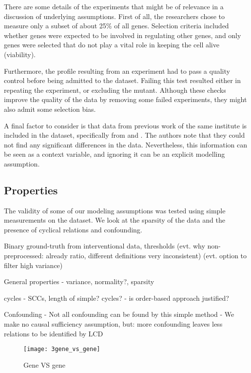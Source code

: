 There are some details of the experiments that might be of relevance in a discussion of underlying assumptions. First of all, the researchers chose to measure only a subset of about 25\% of all genes. Selection criteria included whether genes were expected to be involved in regulating other genes, and only genes were selected that do not play a vital role in keeping the cell alive (viability).

Furthermore, the profile resulting from an experiment had to pass a quality control before being admitted to the dataset. Failing this test resulted either in repeating the experiment, or excluding the mutant. Although these checks improve the quality of the data by removing some failed experiments, they might also admit some selection bias.

A final factor to consider is that  data from previous work of the same institute is included in the dataset, specifically from \citet{lenstra2011specificity} and \citet{van2010functional}. The authors note that they could not find any significant differences in the data. Nevertheless, this information can be seen as a context variable, and ignoring it can be an explicit modelling assumption.


\subsection{Properties}
The validity of some of our modeling assumptions was tested using simple measurements on the dataset. We look at the sparsity of the data and the presence of cyclical relations and confounding. 

Binary ground-truth from interventional data, thresholds 
(evt. why non-preprocessed: already ratio, different definitions very inconsistent)
(evt. option to filter high variance)

General properties
- variance, normality?, sparsity

cycles
- SCCs, length of simple? cycles?
- is order-based approach justified?

Confounding
- Not all confounding can be found by this simple method
- We make no causal sufficiency assumption, but: more confounding leaves less relations to be identified by LCD

\begin{figure}[h]
    \centering
    \texttt{[image: 3gene\_vs\_gene]}
    \caption{Gene VS gene}
    \label{fig:3:genevsgene}
\end{figure}

